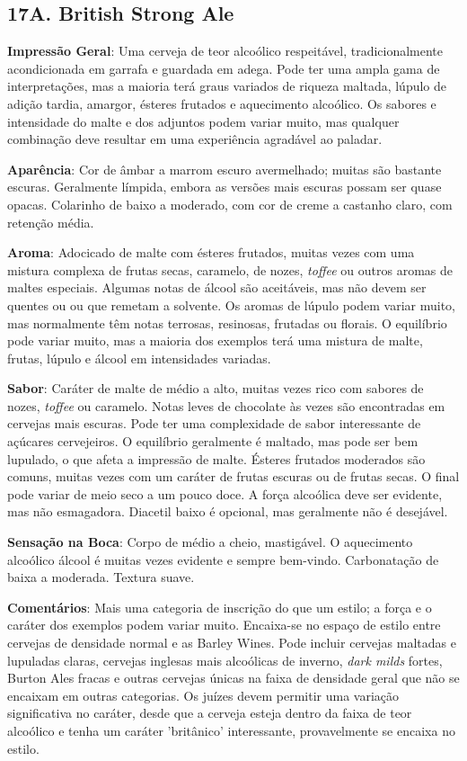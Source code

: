 \subsection*{17A. British Strong Ale}

\textbf{Impressão Geral}: Uma cerveja de teor alcoólico respeitável, tradicionalmente acondicionada em garrafa e guardada em adega. Pode ter uma ampla gama de interpretações, mas a maioria terá graus variados de riqueza maltada, lúpulo de adição tardia, amargor, ésteres frutados e aquecimento alcoólico. Os sabores e intensidade do malte e dos adjuntos podem variar muito, mas qualquer combinação deve resultar em uma experiência agradável ao paladar.

\textbf{Aparência}: Cor de âmbar a marrom escuro avermelhado; muitas são bastante escuras. Geralmente límpida, embora as versões mais escuras possam ser quase opacas. Colarinho de baixo a moderado, com cor de creme a castanho claro, com retenção média.

\textbf{Aroma}: Adocicado de malte com ésteres frutados, muitas vezes com uma mistura complexa de frutas secas, caramelo, de nozes, \textit{toffee} ou outros aromas de maltes especiais. Algumas notas de álcool são aceitáveis, mas não devem ser quentes ou ou que remetam a solvente. Os aromas de lúpulo podem variar muito, mas normalmente têm notas terrosas, resinosas, frutadas ou florais. O equilíbrio pode variar muito, mas a maioria dos exemplos terá uma mistura de malte, frutas, lúpulo e álcool em intensidades variadas.

\textbf{Sabor}: Caráter de malte de médio a alto, muitas vezes rico com sabores de nozes, \textit{toffee} ou caramelo. Notas leves de chocolate às vezes são encontradas em cervejas mais escuras. Pode ter uma complexidade de sabor interessante de açúcares cervejeiros. O equilíbrio geralmente é maltado, mas pode ser bem lupulado, o que afeta a impressão de malte. Ésteres frutados moderados são comuns, muitas vezes com um caráter de frutas escuras ou de frutas secas. O final pode variar de meio seco a um pouco doce. A força alcoólica deve ser evidente, mas não esmagadora. Diacetil baixo é opcional, mas geralmente não é desejável.

\textbf{Sensação na Boca}: Corpo de médio a cheio, mastigável. O aquecimento alcoólico álcool é muitas vezes evidente e sempre bem-vindo. Carbonatação de baixa a moderada. Textura suave.

\textbf{Comentários}: Mais uma categoria de inscrição do que um estilo; a força e o caráter dos exemplos podem variar muito. Encaixa-se no espaço de estilo entre cervejas de densidade normal e as Barley Wines. Pode incluir cervejas maltadas e lupuladas claras, cervejas inglesas mais alcoólicas de inverno, \textit{dark milds} fortes, Burton Ales fracas e outras cervejas únicas na faixa de densidade geral que não se encaixam em outras categorias. Os juízes devem permitir uma variação significativa no caráter, desde que a cerveja esteja dentro da faixa de teor alcoólico e tenha um caráter 'britânico' interessante, provavelmente se encaixa no estilo.


